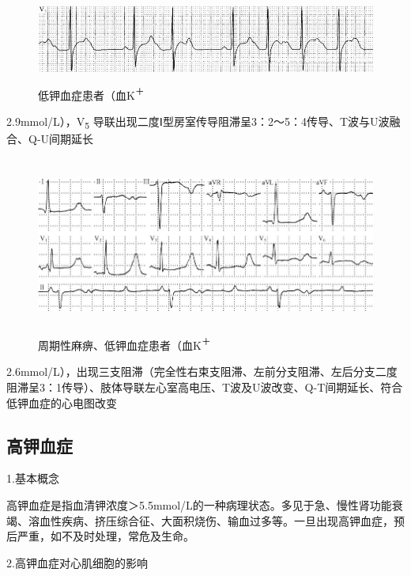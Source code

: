 \begin{figure}[!htbp]
 \centering
 \includegraphics[width=5.58333in,height=1.09375in]{./images/Image00730.jpg}
 \captionsetup{justification=centering}
 \caption{低钾血症患者（血K\textsuperscript{＋}}
 \label{fig45-2}
  \end{figure} 
2.9mmol/L），V\textsubscript{5}
导联出现二度Ⅰ型房室传导阻滞呈3：2～5：4传导、T波与U波融合、Q-U间期延长

\begin{figure}[!htbp]
 \centering
 \includegraphics[width=5.79167in,height=2.28125in]{./images/Image00731.jpg}
 \captionsetup{justification=centering}
 \caption{周期性麻痹、低钾血症患者（血K\textsuperscript{＋}}
 \label{fig45-3}
  \end{figure} 
2.6mmol/L），出现三支阻滞（完全性右束支阻滞、左前分支阻滞、左后分支二度阻滞呈3：1传导）、肢体导联左心室高电压、T波及U波改变、Q-T间期延长、符合低钾血症的心电图改变

\protect\hypertarget{text00053.htmlux5cux23subid638}{}{}

\subsection{高钾血症}

1.基本概念

高钾血症是指血清钾浓度＞5.5mmol/L的一种病理状态。多见于急、慢性肾功能衰竭、溶血性疾病、挤压综合征、大面积烧伤、输血过多等。一旦出现高钾血症，预后严重，如不及时处理，常危及生命。

2.高钾血症对心肌细胞的影响

